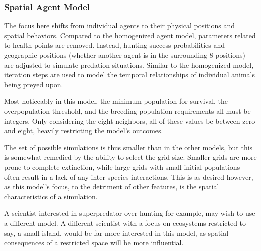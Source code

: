 \documentclass[journal]{IEEEtran}
\begin{document}
\subsubsection{Spatial Agent Model}
The focus here shifts from individual agents to their physical positions and spatial behaviors. Compared to the homogenized agent model, parameters related to health points are removed. Instead, hunting success probabilities and geographic positions (whether another agent is in the surrounding 8 positions) are adjusted to simulate predation situations. Similar to the homogenized model, iteration steps are used to model the temporal relationships of individual animals being preyed upon.\par
Most noticeably in this model, the minimum population for survival, the overpopulation threshold, and the breeding population requirements all must be integers. Only considering the eight neighbors, all of these values be between zero and eight, heavily restricting the model's outcomes.\par
The set of possible simulations is thus smaller than in the other models, but this is somewhat remedied by the ability to select the grid-size. Smaller grids are more prone to complete extinction, while large grids with small initial populations often result in a lack of any inter-species interactions. This is as desired however, as this model's focus, to the detriment of other features, is the spatial characteristics of a simulation.\par
A scientist interested in superpredator over-hunting for example, may wish to use a different model. A different scientist with a focus on ecosystems restricted to say, a small island, would be far more interested in this model, as spatial consequences of a restricted space will be more influential.
\end{document}
